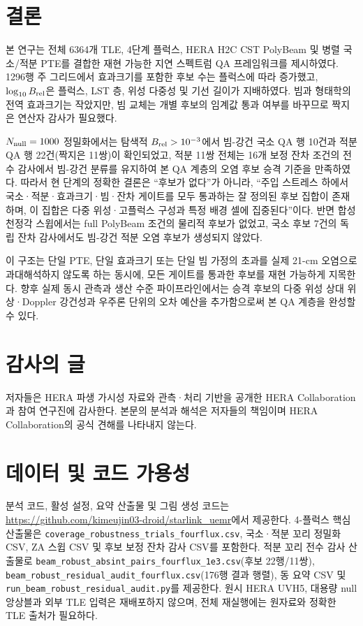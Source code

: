 \documentclass[final,5p,times]{elsarticle}
\newcommand{\NTLERecords}{6364}
\newcommand{\NMainRows}{1296}
\newcommand{\NLocalTailBeamRobustEthree}{10}
\newcommand{\NIntTailBeamRobustEthree}{22}
\newcommand{\NIntAuditPairs}{11}
\newcommand{\NIntAuditConds}{16}
\begin{document}
\section{결론}
\label{sec:conclusion}

본 연구는 전체 \NTLERecords{}개 TLE, 4단계 플럭스, HERA H2C CST
PolyBeam 및 병렬 국소/적분 PTE를 결합한 재현 가능한 지연 스펙트럼
QA 프레임워크를 제시하였다. \NMainRows{}행 주 그리드에서 효과크기를
포함한 후보 수는 플럭스에 따라 증가했고, $\log_{10}B_{\rm rel}$은
플럭스, LST 층, 위성 다중성 및 기선 길이가 지배하였다. 빔과 형태학의
전역 효과크기는 작았지만, 빔 교체는 개별 후보의 임계값 통과 여부를
바꾸므로 짝지은 연산자 감사가 필요했다.

$N_{\rm null}=1000$ 정밀화에서는 탐색적 $B_{\rm rel}>10^{-3}$에서
빔-강건 국소 QA 행 \NLocalTailBeamRobustEthree{}건과 적분 QA 행
\NIntTailBeamRobustEthree{}건(짝지은 \NIntAuditPairs{}쌍)이
확인되었고, 적분 \NIntAuditPairs{}쌍 전체는 \NIntAuditConds{}개
보정 잔차 조건의 전수 감사에서 빔-강건 분류를 유지하여 본 QA
계층의 오염 후보 승격 기준을 만족하였다. 따라서 현 단계의 정확한
결론은 ``후보가 없다''가 아니라, ``주입 스트레스 하에서
국소·적분·효과크기·빔·잔차 게이트를 모두 통과하는 잘 정의된 후보
집합이 존재하며, 이 집합은 다중 위성·고플럭스 구성과 특정 배경
셀에 집중된다''이다. 반면 합성 천정각 스윕에서는 full PolyBeam
조건의 물리적 후보가 없었고, 국소 후보 7건의 독립 잔차 감사에서도
빔-강건 적분 오염 후보가 생성되지 않았다.

이 구조는 단일 PTE, 단일 효과크기 또는 단일 빔 가정의 초과를 실제
21-cm 오염으로 과대해석하지 않도록 하는 동시에, 모든 게이트를
통과한 후보를 재현 가능하게 지목한다. 향후 실제 동시 관측과 생산
수준 파이프라인에서는 승격 후보의 다중 위성 상대 위상·Doppler
강건성과 우주론 단위의 오차 예산을 추가함으로써 본 QA 계층을
완성할 수 있다.

\section*{감사의 글}
저자들은 HERA 파생 가시성 자료와 관측·처리 기반을 공개한 HERA
Collaboration과 참여 연구진에 감사한다. 본문의 분석과 해석은
저자들의 책임이며 HERA Collaboration의 공식 견해를 나타내지 않는다.

\section*{데이터 및 코드 가용성}
분석 코드, 활성 설정, 요약 산출물 및 그림 생성 코드는
\url{https://github.com/kimeujin03-droid/starlink_uemr}에서 제공한다.
4-플럭스 핵심 산출물은 \texttt{coverage\_robustness\_trials\_fourflux.csv},
국소·적분 꼬리 정밀화 CSV, ZA 스윕 CSV 및 후보 보정 잔차 감사 CSV를
포함한다. 적분 꼬리 전수 감사 산출물로
\texttt{beam\_robust\_absint\_pairs\_fourflux\_1e3.csv}(후보 22행/11쌍),
\texttt{beam\_robust\_residual\_audit\_fourflux.csv}(176행 결과 행렬),
동 요약 CSV 및 \texttt{run\_beam\_robust\_residual\_audit.py}를
제공한다. 원시 HERA UVH5, 대용량 null 앙상블과 외부 TLE 입력은
재배포하지 않으며, 전체 재실행에는 원자료와 정확한 TLE 출처가
필요하다.



\end{document}
